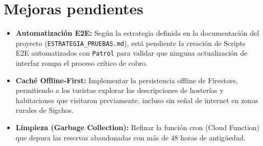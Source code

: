 \documentclass{article}
\begin{document}
\section{Mejoras pendientes}
\begin{itemize}[label=\small\color{verdeO}$\blacksquare$]
    \item \textbf{Automatización E2E:} Según la estrategia definida en la documentación del proyecto (\texttt{ESTRATEGIA\_PRUEBAS.md}), está pendiente la creación de Scripts E2E automatizados con \texttt{Patrol} para validar que ninguna actualización de interfaz rompa el proceso crítico de cobro.
    \item \textbf{Caché Offline-First:} Implementar la persistencia offline de Firestore, permitiendo a los turistas explorar las descripciones de hosterías y habitaciones que visitaron previamente, incluso sin señal de internet en zonas rurales de Sigchos.
    \item \textbf{Limpieza (Garbage Collection):} Refinar la función cron (Cloud Function) que depura las reservas abandonadas con más de 48 horas de antigüedad.
\end{itemize}
\end{document}
